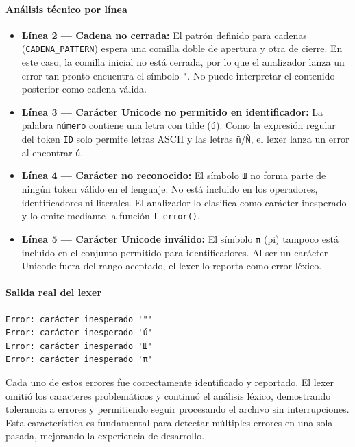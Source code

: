 \documentclass{article}
\begin{document}
\paragraph{Análisis técnico por línea}

\begin{itemize}
  \item \textbf{Línea 2 — Cadena no cerrada:} El patrón definido para cadenas (\texttt{CADENA\_PATTERN}) espera una comilla doble de apertura y otra de cierre. En este caso, la comilla inicial no está cerrada, por lo que el analizador lanza un error tan pronto encuentra el símbolo \texttt{"}. No puede interpretar el contenido posterior como cadena válida.

  \item \textbf{Línea 3 — Carácter Unicode no permitido en identificador:} La palabra \texttt{número} contiene una letra con tilde (\texttt{ú}). Como la expresión regular del token \texttt{ID} solo permite letras ASCII y las letras \texttt{ñ}/\texttt{Ñ}, el lexer lanza un error al encontrar \texttt{ú}.

  \item \textbf{Línea 4 — Carácter no reconocido:} El símbolo \texttt{Ш} no forma parte de ningún token válido en el lenguaje. No está incluido en los operadores, identificadores ni literales. El analizador lo clasifica como carácter inesperado y lo omite mediante la función \texttt{t\_error()}.

  \item \textbf{Línea 5 — Carácter Unicode inválido:} El símbolo \texttt{π} (pi) tampoco está incluido en el conjunto permitido para identificadores. Al ser un carácter Unicode fuera del rango aceptado, el lexer lo reporta como error léxico.
\end{itemize}

\paragraph{Salida real del lexer}

\begin{verbatim}
Error: carácter inesperado '"'
Error: carácter inesperado 'ú'
Error: carácter inesperado 'Ш'
Error: carácter inesperado 'π'
\end{verbatim}

Cada uno de estos errores fue correctamente identificado y reportado. El lexer omitió los caracteres problemáticos y continuó el análisis léxico, demostrando tolerancia a errores y permitiendo seguir procesando el archivo sin interrupciones. Esta característica es fundamental para detectar múltiples errores en una sola pasada, mejorando la experiencia de desarrollo.
\end{document}

